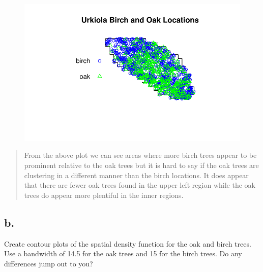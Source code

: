 \documentclass[
  letterpaper,
  DIV=11,
  numbers=noendperiod]{scrartcl}
\begin{document}
\begin{figure}[H]

{\centering \includegraphics{cc-r-kd-hw_files/figure-pdf/unnamed-chunk-1-1.pdf}

}

\end{figure}

\begin{quote}
From the above plot we can see areas where more birch trees appear to be
prominent relative to the oak trees but it is hard to say if the oak
trees are clustering in a different manner than the birch locations. It
does appear that there are fewer oak trees found in the upper left
region while the oak trees do appear more plentiful in the inner
regions.
\end{quote}

\hypertarget{b.}{%
\subsection{b.}\label{b.}}

Create contour plots of the spatial density function for the oak and
birch trees. Use a bandwidth of 14.5 for the oak trees and 15 for the
birch trees. Do any differences jump out to you?
\end{document}
